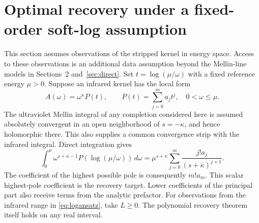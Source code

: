 \documentclass[11pt]{article}
\theoremstyle{remark}\newtheorem{remark}[theorem]{Remark}
\begin{document}


















\section{Optimal recovery under a fixed-order soft-log assumption}
This section assumes observations of the stripped kernel in energy space. Access to these observations is an additional data assumption beyond the Mellin-line models in Sections~2 and~\ref{sec:direct}.
Set $t=\log(\mu/\omega)$ with a fixed reference energy $\mu>0$. Suppose an infrared kernel has the local form
\begin{equation}\label{eq:logansatz}
 A(\omega)=\omega^\kappa P(t),\qquad
 P(t)=\sum_{j=0}^m a_jt^j,\quad 0<\omega\le\mu.
\end{equation}
The ultraviolet Mellin integral of any completion considered here is assumed absolutely convergent in an open neighborhood of $s=-\kappa$, and hence holomorphic there. This also supplies a common convergence strip with the infrared integral. Direct integration gives
\begin{equation}\label{eq:polelog}
 \int_0^\mu \omega^{s+\kappa-1}P(\log(\mu/\omega))\,d\omega
 =\mu^{s+\kappa}\sum_{j=0}^m\frac{j!a_j}{(s+\kappa)^{j+1}}.
\end{equation}
The coefficient of the highest possible pole is consequently $m!a_m$. This scalar highest-pole coefficient is the recovery target. Lower coefficients of the principal part also receive terms from the analytic prefactor.
For observations from the infrared range in \eqref{eq:logansatz}, take $L\ge0$. The polynomial recovery theorem itself holds on any real interval.
\end{document}
